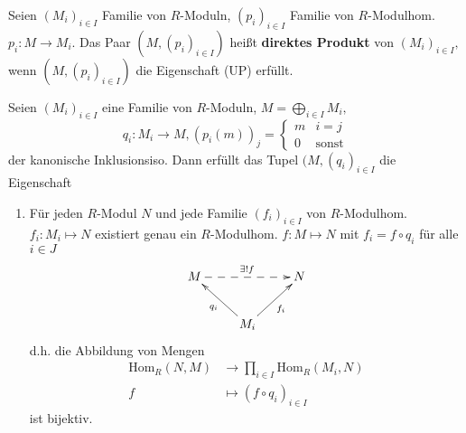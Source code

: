 \documentclass[a4paper, titlepage]{article}
\theoremstyle{definition}
\newcommand{\Hom}{\mathrm{Hom}}
\begin{document}
        \begin{definition}
            Seien $(M_i)_{i\in I}$ Familie von $R$-Moduln, $(p_i)_{i\in I}$ Familie von $R$-Modulhom. $p_i:M\longrightarrow M_i.$\newline
            Das Paar $(M,(p_i)_{i\in I})$ heißt \textbf{direktes Produkt} von $(M_i)_{i\in I},$ wenn $(M,(p_i)_{i\in I})$ die Eigenschaft (UP) erfüllt.
        \end{definition}
        \begin{satz}
            Seien $(M_i)_{i\in I}$ eine Familie von $R$-Moduln, $M=\bigoplus\limits_{i\in I}M_i,$
            $$q_i:M_i\longrightarrow M,(p_i(m))_j=\left\{\begin{array}{cc}
                m & i=j\\
                0 & \text{sonst}
            \end{array}
                \right.$$
                 der kanonische Inklusionsiso. Dann erfüllt das Tupel $(M,(q_i)_{i\in I}$ die Eigenschaft
            \begin{enumerate}[(US)]
                   \item Für jeden $R$-Modul $N$ und jede Familie $(f_i)_{i\in I}$ von $R$-Modulhom. $f_i:M_i\mapsto N$ existiert genau ein $R$-Modulhom. $f:M\mapsto N $ mit $f_i=f\circ q_i $ für alle $i\in J$
                   \[ 
                   \begin{xy}
                       \xymatrix{
                       M \ar@{-->}[rr]^{\exists!f}  &&N\\
                       &\ar[ul]^{q_i}M_i\ar[ur]_{f_i}&
                       }
                   \end{xy}
                   \]
                   d.h. die Abbildung von Mengen 
                   \begin{align*}
                       \Hom_R(N,M)&\longrightarrow \prod_{i\in I}\Hom_R(M_i,N)\\
                       f&\longmapsto (f\circ q_i)_{i\in I}
                   \end{align*}
                   ist bijektiv.
               \end{enumerate}
        \end{satz}
\end{document}
